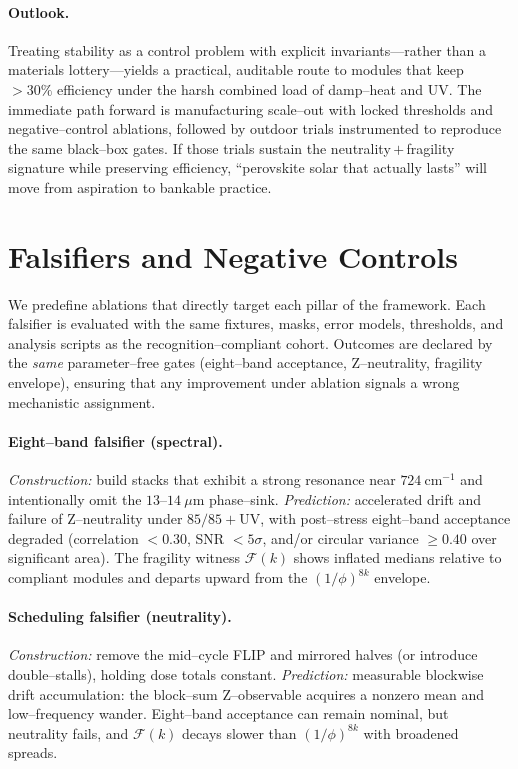\documentclass[12pt]{article}
\begin{document}
\paragraph{Outlook.}
Treating stability as a control problem with explicit invariants—rather than a materials lottery—yields a practical, auditable route to modules that keep $>30\%$ efficiency under the harsh combined load of damp–heat and UV. The immediate path forward is manufacturing scale–out with locked thresholds and negative–control ablations, followed by outdoor trials instrumented to reproduce the same black–box gates. If those trials sustain the neutrality\,$+$\,fragility signature while preserving efficiency, “perovskite solar that actually lasts” will move from aspiration to bankable practice.

\section{Falsifiers and Negative Controls}

We predefine ablations that directly target each pillar of the framework. Each falsifier is evaluated with the same fixtures, masks, error models, thresholds, and analysis scripts as the recognition–compliant cohort. Outcomes are declared by the \emph{same} parameter–free gates (eight–band acceptance, Z–neutrality, fragility envelope), ensuring that any improvement under ablation signals a wrong mechanistic assignment.

\paragraph{Eight–band falsifier (spectral).}
\emph{Construction:} build stacks that exhibit a strong resonance near $724~\mathrm{cm}^{-1}$ and intentionally omit the $13$–$14~\mu\mathrm{m}$ phase–sink.  
\emph{Prediction:} accelerated drift and failure of Z–neutrality under $85/85+\mathrm{UV}$, with post–stress eight–band acceptance degraded (correlation $<0.30$, SNR $<5\sigma$, and/or circular variance $\ge 0.40$ over significant area). The fragility witness $\mathcal{F}(k)$ shows inflated medians relative to compliant modules and departs upward from the $(1/\phi)^{8k}$ envelope.

\paragraph{Scheduling falsifier (neutrality).}
\emph{Construction:} remove the mid–cycle FLIP and mirrored halves (or introduce double–stalls), holding dose totals constant.  
\emph{Prediction:} measurable blockwise drift accumulation: the block–sum Z–observable acquires a nonzero mean and low–frequency wander. Eight–band acceptance can remain nominal, but neutrality fails, and $\mathcal{F}(k)$ decays slower than $(1/\phi)^{8k}$ with broadened spreads.
\end{document}
